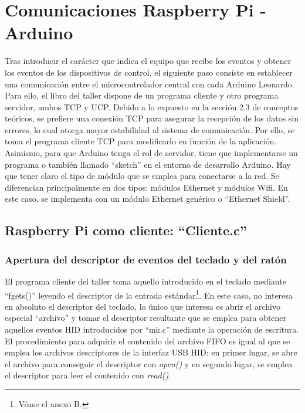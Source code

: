 \clearpage
\section{Comunicaciones Raspberry Pi - Arduino} \label{s3_5}

Tras introducir el carácter que indica el equipo que recibe los eventos y obtener los eventos de los dispositivos de control, el siguiente paso consiste en establecer una comunicación entre el microcontrolador central con cada Arduino Leonardo. Para ello, el libro del taller dispone de un programa cliente y otro programa servidor, ambos TCP y UCP. Debido a lo expuesto en la sección 2.3 de conceptos teóricos, se prefiere una conexión TCP para asegurar la recepción de los datos sin errores, lo cual otorga mayor estabilidad al sistema de comunicación. Por ello, se toma el programa cliente TCP para modificarlo en función de la aplicación. Asimismo, para que Arduino tenga el rol de servidor, tiene que implementarse un programa o también llamado ``sketch'' en el entorno de desarrollo Arduino. Hay que tener claro el tipo de módulo que se emplea para conectarse a la red. Se diferencian principalmente en dos tipos: módulos Ethernet y módulos Wifi. En este caso, se implementa con un módulo Ethernet genérico o ``Ethernet Shield''.


\subsection{Raspberry Pi como cliente: ``Cliente.c''} \label{s3_5_1}

\subsubsection{Apertura del descriptor de eventos del teclado y del ratón}\label{s3_5_1_1}

El programa cliente del taller toma aquello introducido en el teclado mediante ``fgets()'' leyendo el descriptor de la entrada estándar\footnote{Véase el anexo B.}. En este caso, no interesa en absoluto el descriptor del teclado, lo único que interesa es abrir el archivo especial ``archivo'' y tomar el descriptor resultante que se emplea para obtener aquellos eventos HID introducidos por ``mk.c'' mediante la operación de escritura. El procedimiento para adquirir el contenido del archivo FIFO es igual al que se emplea los archivos descriptores de la interfaz USB HID: en primer lugar, se abre el archivo para conseguir el descriptor con {\itshape open()} y en segundo lugar, se emplea el descriptor para leer el contenido con {\itshape read()}. 

